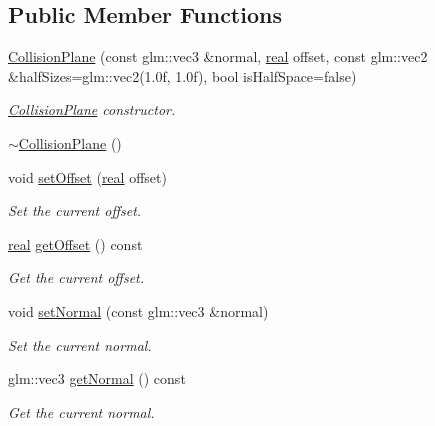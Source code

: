 \subsection*{Public Member Functions}
\begin{DoxyCompactItemize}
\item 
\mbox{\hyperlink{classr3_1_1_collision_plane_ae3f8642b62667018e4a4c3120880fd0f}{Collision\+Plane}} (const glm\+::vec3 \&normal, \mbox{\hyperlink{namespacer3_ab2016b3e3f743fb735afce242f0dc1eb}{real}} offset, const glm\+::vec2 \&half\+Sizes=glm\+::vec2(1.\+0f, 1.\+0f), bool is\+Half\+Space=false)
\begin{DoxyCompactList}\small\item\em \mbox{\hyperlink{classr3_1_1_collision_plane}{Collision\+Plane}} constructor. \end{DoxyCompactList}\item 
\mbox{\hyperlink{classr3_1_1_collision_plane_a4c83b51c544a5fda9d949baced5cea02}{$\sim$\+Collision\+Plane}} ()
\item 
void \mbox{\hyperlink{classr3_1_1_collision_plane_ae37e09e6b807cdd800671daa5623b073}{set\+Offset}} (\mbox{\hyperlink{namespacer3_ab2016b3e3f743fb735afce242f0dc1eb}{real}} offset)
\begin{DoxyCompactList}\small\item\em Set the current offset. \end{DoxyCompactList}\item 
\mbox{\hyperlink{namespacer3_ab2016b3e3f743fb735afce242f0dc1eb}{real}} \mbox{\hyperlink{classr3_1_1_collision_plane_a62e2b4bd6a811f8d2541329cd9a49bf8}{get\+Offset}} () const
\begin{DoxyCompactList}\small\item\em Get the current offset. \end{DoxyCompactList}\item 
void \mbox{\hyperlink{classr3_1_1_collision_plane_a1fa140b6648f14bef9720ac0d4eefc99}{set\+Normal}} (const glm\+::vec3 \&normal)
\begin{DoxyCompactList}\small\item\em Set the current normal. \end{DoxyCompactList}\item 
glm\+::vec3 \mbox{\hyperlink{classr3_1_1_collision_plane_aa6605acf447da4e45084e6d25c1067ad}{get\+Normal}} () const
\begin{DoxyCompactList}\small\item\em Get the current normal. \end{DoxyCompactList}\item 

\end{DoxyCompactItemize}
